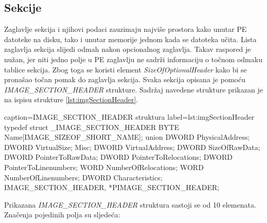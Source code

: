 \documentclass[times, utf8, diplomski, numeric]{fer}
\begin{document}
\subsection{Sekcije}
\label{sec:sekcije}

Zaglavlje sekcija i njihovi podaci zauzimaju najviše prostora
kako unutar PE datoteke na disku, tako i unutar memorije jednom
kada se datoteka učita. Lista zaglavlja sekcija slijedi odmah
nakon opcionalnog zaglavlja. Takav raspored je nužan, jer niti
jedno polje u PE zaglavlju ne sadrži informaciju o točnom odmaku
tablice sekcija. Zbog toga se koristi element
\emph{SizeOfOptionalHeader} kako bi se pronašao točan pomak do
zaglavlja sekcija. Svaka sekcija opisana je pomoću
\emph{IMAGE\_SECTION\_HEADER} strukture. Sadržaj navedene
strukture prikazan je na ispisu strukture \ref{lst:imgSectionHeader}.				%

\begin{struktura} {caption=IMAGE\_SECTION\_HEADER struktura} {label=lst:imgSectionHeader}
typedef struct _IMAGE_SECTION_HEADER {
	BYTE    Name[IMAGE_SIZEOF_SHORT_NAME];
	union {
		DWORD   PhysicalAddress;
		DWORD   VirtualSize;
	} Misc;
	DWORD   VirtualAddress;
	DWORD   SizeOfRawData;
	DWORD   PointerToRawData;
	DWORD   PointerToRelocations;
	DWORD   PointerToLinenumbers;
	WORD    NumberOfRelocations;
	WORD    NumberOfLinenumbers;
	DWORD   Characteristics;
} IMAGE_SECTION_HEADER, *PIMAGE_SECTION_HEADER;
\end{struktura}

Prikazana \emph{IMAGE\_SECTION\_HEADER} struktura sastoji se od
10 elemenata. Značenja pojedinih polja su sljedeća:	
\end{document}

